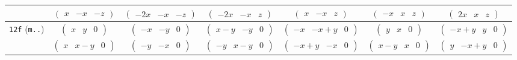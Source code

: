 \documentclass[fleqn,9pt,landscape]{jsarticle}
\begin{document}
\begin{center}
\begin{longtable}{ccccccc}
& $ \begin{pmatrix} x & - x & - z \end{pmatrix} $ & $ \begin{pmatrix} - 2 x & - x & - z \end{pmatrix} $ & $ \begin{pmatrix} - 2 x & - x & z \end{pmatrix} $ & $ \begin{pmatrix} x & - x & z \end{pmatrix} $ & $ \begin{pmatrix} - x & x & z \end{pmatrix} $ & $ \begin{pmatrix} 2 x & x & z \end{pmatrix} $ \\ \hline
{\tt 12f} ({\tt m..}) & $ \begin{pmatrix} x & y & 0 \end{pmatrix} $ & $ \begin{pmatrix} - x & - y & 0 \end{pmatrix} $ & $ \begin{pmatrix} x - y & - y & 0 \end{pmatrix} $ & $ \begin{pmatrix} - x & - x + y & 0 \end{pmatrix} $ & $ \begin{pmatrix} y & x & 0 \end{pmatrix} $ & $ \begin{pmatrix} - x + y & y & 0 \end{pmatrix} $ \\
& $ \begin{pmatrix} x & x - y & 0 \end{pmatrix} $ & $ \begin{pmatrix} - y & - x & 0 \end{pmatrix} $ & $ \begin{pmatrix} - y & x - y & 0 \end{pmatrix} $ & $ \begin{pmatrix} - x + y & - x & 0 \end{pmatrix} $ & $ \begin{pmatrix} x - y & x & 0 \end{pmatrix} $ & $ \begin{pmatrix} y & - x + y & 0 \end{pmatrix} $ \\ \hline

\end{longtable}
\end{center}
\end{document}
